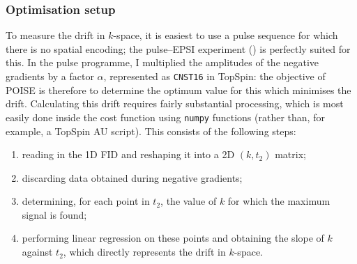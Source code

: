 

\subsubsection{Optimisation setup}

To measure the drift in $k$-space, it is easiest to use a pulse sequence for which there is no spatial encoding; the pulse--EPSI experiment () is perfectly suited for this.
In the pulse programme, I multiplied the amplitudes of the negative gradients by a factor $\alpha$, represented as \texttt{CNST16} in TopSpin:
the objective of POISE is therefore to determine the optimum value for this which minimises the drift.
Calculating this drift requires fairly substantial processing, which is most easily done inside the cost function using \texttt{numpy} functions (rather than, for example, a TopSpin AU script).
This consists of the following steps:
\begin{enumerate}
    \item reading in the 1D FID and reshaping it into a 2D $(k, t_2)$ matrix;
    \item discarding data obtained during negative gradients;
    \item determining, for each point in $t_2$, the value of $k$ for which the maximum signal is found;
    \item performing linear regression on these points and obtaining the slope of $k$ against $t_2$, which directly represents the drift in $k$-space.
\end{enumerate}
